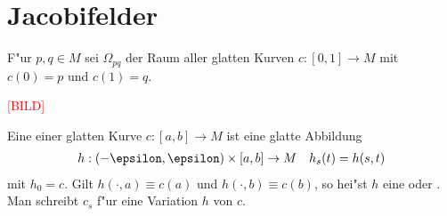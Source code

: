 \chapter{Jacobifelder}

F"ur $p,q \in M$ sei $\Omega_{pq}$ der Raum aller glatten Kurven $c:[0,1] \to M$ mit $c(0)=p$ und $c(1)=q$.
\begin{center}\textcolor{red}{[BILD]}\end{center}

\begin{Dfn}
Eine  einer glatten Kurve $c:[a,b] \to M$ ist eine glatte Abbildung
\begin{align*}
	h:(-\epsilon, \epsilon) \X [a,b] \to M && h_s(t) = h(s,t)
\end{align*}
mit $h_0 = c$. Gilt $h(\cdot, a) \equiv c(a)$ und $h(\cdot, b) \equiv c(b)$, so hei"st $h$ eine  oder . Man schreibt $c_s$ f"ur eine Variation $h$ von $c$.
\end{Dfn}

